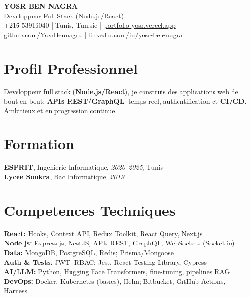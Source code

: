 \documentclass[10pt,a4paper]{article}
\begin{document}
\begin{center}
  {\Large\bfseries YOSR BEN NAGRA}\\[2pt]
  {\small Developpeur Full Stack (Node.js/React)}\\[3pt]
  {\footnotesize +216 53916040 \;|\; Tunis, Tunisie \;|\; \href{https://portfolio-yosr.vercel.app/en}{portfolio-yosr.vercel.app} \;|\; \href{https://github.com/YosrBennagra}{github.com/YosrBennagra} \;|\; \href{https://www.linkedin.com/in/yosr-ben-nagra/}{linkedin.com/in/yosr-ben-nagra}}
\end{center}

\section*{Profil Professionnel}
{\small
Developpeur full stack (\textbf{Node.js/React}), je construis des applications web de bout en bout: \textbf{APIs REST/GraphQL}, temps reel, authentification et \textbf{CI/CD}. Ambitieux et en progression continue.
}

\vspace{4pt}

\section*{Formation}
{\small
\textbf{ESPRIT}, Ingenierie Informatique, \textit{2020--2025}, Tunis\\[1pt]
\textbf{Lycee Soukra}, Bac Informatique, \textit{2019}
}

\vspace{4pt}

\section*{Competences Techniques}
{\small
\textbf{React:} Hooks, Context API, Redux Toolkit, React Query, Next.js\\[2pt]
\textbf{Node.js:} Express.js, NestJS, APIs REST, GraphQL, WebSockets (Socket.io)\\[2pt]
\textbf{Data:} MongoDB, PostgreSQL, Redis; Prisma/Mongoose\\[2pt]
\textbf{Auth \& Tests:} JWT, RBAC; Jest, React Testing Library, Cypress\\[2pt]
\textbf{AI/LLM:} Python, Hugging Face Transformers, fine-tuning, pipelines RAG\\[2pt]
\textbf{DevOps:} Docker, Kubernetes (basics), Helm; Bitbucket, GitHub Actions, Harness
}
\end{document}
